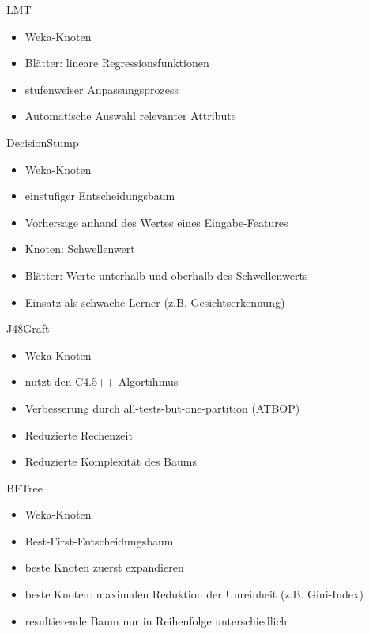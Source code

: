 \documentclass[
	handout,
  	aspectratio=169
]{beamer}
\begin{document}
		\begin{frame}{LMT}	
			\begin{itemize}
				\item Weka-Knoten
				\item Blätter: lineare Regressionsfunktionen
				\item stufenweiser Anpassungsprozess
				\item Automatische Auswahl relevanter Attribute
			\end{itemize}		
		\end{frame}

		\begin{frame}{DecisionStump}		
			\begin{itemize}
				\item Weka-Knoten
				\item einstufiger Entscheidungsbaum
				\item Vorhersage anhand des Wertes eines Eingabe-Features
				\item Knoten: Schwellenwert
				\item Blätter: Werte unterhalb und oberhalb des Schwellenwerts
				\item Einsatz als \glqq{}schwache Lerner\grqq{} (z.B. Gesichtserkennung)
			\end{itemize}
		\end{frame}

		\begin{frame}{J48Graft}	
			\begin{itemize}
				\item Weka-Knoten
				\item nutzt den C4.5++ Algortihmus
				\item Verbesserung durch \glqq{}all-tests-but-one-partition\grqq{} (ATBOP)
				\item Reduzierte Rechenzeit
				\item Reduzierte Komplexität des Baums
			\end{itemize}	
		\end{frame}

		\begin{frame}{BFTree}	
			\begin{itemize}
				\item Weka-Knoten
				\item Best-First-Entscheidungsbaum
				\item \glqq{}beste\grqq{} Knoten zuerst expandieren
				\item \glqq{}beste\grqq{} Knoten: maximalen Reduktion der Unreinheit (z.B. Gini-Index)
				\item resultierende Baum nur in Reihenfolge unterschiedlich
			\end{itemize}		
		\end{frame}
\end{document}
